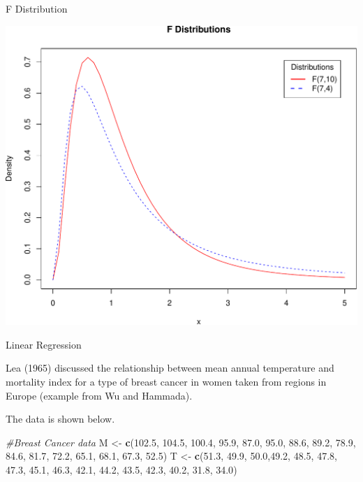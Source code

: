 \documentclass[9pt,ignorenonframetext,]{beamer}
\newenvironment{Shaded}{\begin{snugshade}}{\end{snugshade}}
\newcommand{\KeywordTok}[1]{\textcolor[rgb]{0.13,0.29,0.53}{\textbf{{#1}}}}
\newcommand{\FloatTok}[1]{\textcolor[rgb]{0.00,0.00,0.81}{{#1}}}
\newcommand{\StringTok}[1]{\textcolor[rgb]{0.31,0.60,0.02}{{#1}}}
\newcommand{\CommentTok}[1]{\textcolor[rgb]{0.56,0.35,0.01}{\textit{{#1}}}}
\newcommand{\NormalTok}[1]{{#1}}
\begin{document}
\begin{frame}{F Distribution}

\includegraphics{class2-jan11_files/figure-beamer/unnamed-chunk-13-1.pdf}

\end{frame}

\begin{frame}[fragile]{Linear Regression}

Lea (1965) discussed the relationship between mean annual temperature
and mortality index for a type of breast cancer in women taken from
regions in Europe (example from Wu and Hammada).

The data is shown below.

\begin{Shaded}
\begin{Highlighting}[]
\CommentTok{#Breast Cancer data}
\NormalTok{M <-}\StringTok{ }\KeywordTok{c}\NormalTok{(}\FloatTok{102.5}\NormalTok{, }\FloatTok{104.5}\NormalTok{, }\FloatTok{100.4}\NormalTok{, }\FloatTok{95.9}\NormalTok{, }\FloatTok{87.0}\NormalTok{, }\FloatTok{95.0}\NormalTok{, }\FloatTok{88.6}\NormalTok{, }\FloatTok{89.2}\NormalTok{, }
       \FloatTok{78.9}\NormalTok{, }\FloatTok{84.6}\NormalTok{, }\FloatTok{81.7}\NormalTok{, }\FloatTok{72.2}\NormalTok{, }\FloatTok{65.1}\NormalTok{, }\FloatTok{68.1}\NormalTok{, }\FloatTok{67.3}\NormalTok{, }\FloatTok{52.5}\NormalTok{)}
\NormalTok{T <-}\StringTok{ }\KeywordTok{c}\NormalTok{(}\FloatTok{51.3}\NormalTok{, }\FloatTok{49.9}\NormalTok{, }\FloatTok{50.0}\NormalTok{,}\FloatTok{49.2}\NormalTok{, }\FloatTok{48.5}\NormalTok{, }\FloatTok{47.8}\NormalTok{, }\FloatTok{47.3}\NormalTok{, }\FloatTok{45.1}\NormalTok{, }
       \FloatTok{46.3}\NormalTok{, }\FloatTok{42.1}\NormalTok{, }\FloatTok{44.2}\NormalTok{, }\FloatTok{43.5}\NormalTok{, }\FloatTok{42.3}\NormalTok{, }\FloatTok{40.2}\NormalTok{, }\FloatTok{31.8}\NormalTok{, }\FloatTok{34.0}\NormalTok{)}
\end{Highlighting}
\end{Shaded}

\end{frame}
\end{document}
